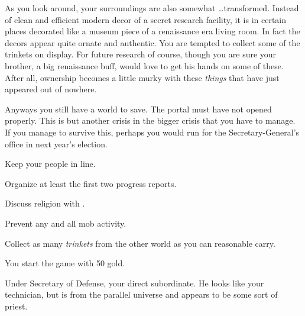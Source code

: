 \documentclass[char]{guildcamp3}
\begin{document}
As you look around, your surroundings are also somewhat \ldots transformed. Instead of clean and efficient modern decor of a secret research facility, it is in certain places decorated like a museum piece of a renaissance era living room. In fact the decors appear quite ornate and authentic. You are tempted to collect some of the trinkets on display. For future research of course, though you are sure your brother, a big renaissance buff, would love to get his hands on some of these. After all, ownership becomes a little murky with these \emph{things} that have just appeared out of nowhere.

Anyways you still have a world to save. The portal must have not opened properly. This is but another crisis in the bigger crisis that you have to manage. If you manage to survive this, perhaps you would run for the Secretary-General's office in next year's election.

\begin{itemz}[Goals]
  \item Keep your people in line.
  \item Organize at least the first two progress reports.
  \item Discuss religion with \cPaladin{}.
  \item Prevent any and all mob activity.
  \item Collect as many \emph{trinkets} from the other world as you can reasonable carry.
\end{itemz}

\begin{itemz}[Notes]
	\item You start the game with 50 gold. 
	\end{itemz}
\begin{contacts}
  \contact{\cPoliTwo{}} Under Secretary of Defense, your direct subordinate.
  \contact{\cPaladin{}} He looks like your technician, but is from the parallel universe and appears to be some sort of priest.
\end{contacts}
\end{document}
